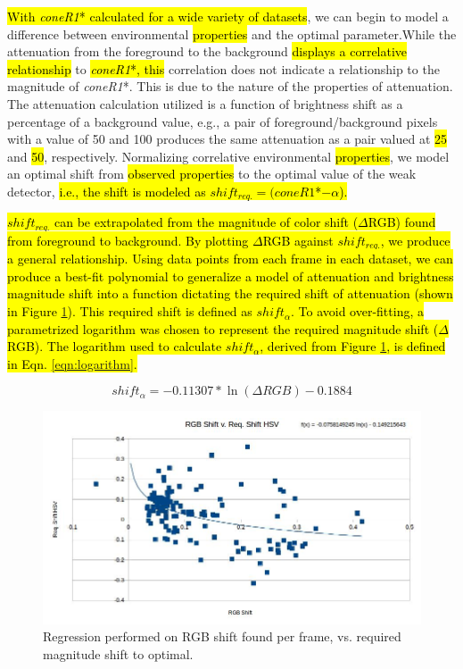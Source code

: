 \documentclass[12pt]{report}
\begin{document}
\hl{With \textit{coneR1}* calculated for a wide variety of datasets}, we can begin to model a difference between environmental \hl{properties} and the optimal parameter.While the attenuation from the foreground to the background \hl{displays a correlative relationship} to \hl{\textit{coneR1}*, this} correlation does not indicate a relationship to the magnitude of \textit{coneR1}*. This is due to the nature of the properties of attenuation. The attenuation calculation utilized is a function of brightness shift as a percentage of a background value, e.g., a pair of foreground/background pixels with a value of 50 and 100 produces the same attenuation as a pair valued at \hl{25} and \hl{50}, respectively. Normalizing correlative environmental \hl{properties}, we model an optimal shift from \hl{observed properties} to the optimal value of the weak detector,\hl{ i.e., the shift is modeled as $shift_{req.} = (coneR1$*$ - \alpha$).} 

\hl{$shift_{req.}$ can be extrapolated from the magnitude of color shift ($\Delta$RGB) found from foreground to background. By plotting $\Delta$RGB against $shift_{req.}$, we produce a general relationship. Using data points from each frame in each dataset, we can produce a best-fit polynomial to generalize a model of attenuation and brightness magnitude shift into a function dictating the required shift of attenuation (shown in Figure \ref{fig:polyfit}). This required shift is defined as $shift_{\alpha}$. To avoid over-fitting, a parametrized logarithm was chosen to represent the required magnitude shift ($\Delta$RGB). The logarithm used to calculate $shift_{\alpha}$, derived from Figure \ref{fig:polyfit}, is defined in Eqn. \ref{eqn:logarithm}.}

\begin{equation}
shift_{\alpha} = -0.11307*\ln(\Delta RGB) - 0.1884 
\label{eqn:logarithm}
\end{equation}

\begin{figure}
  \centering
 \includegraphics[width=1\linewidth]{figures/polyfit.jpg}
  \caption{Regression performed on RGB shift found per frame, vs. required magnitude shift to optimal.}
  \label{fig:polyfit}
\end{figure}
\end{document}
